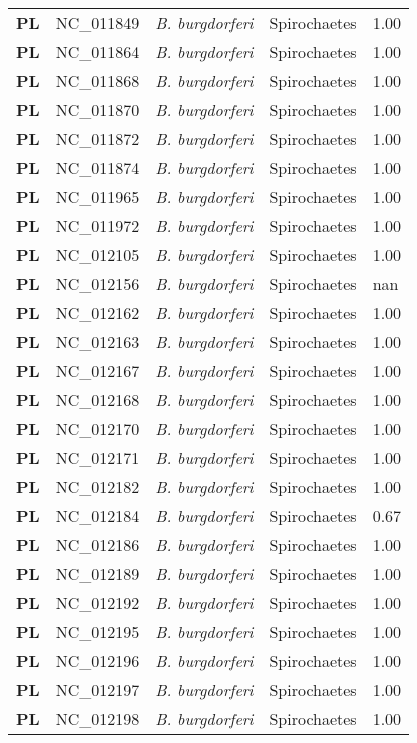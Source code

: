 \begin{adjustwidth}{-3cm}{2cm}
{\begin{supertabular}{>{\bfseries}l|p{0.1\textwidth}p{0.14\textwidth}l|l}
PL & NC\_011849 & \textit{B. burgdorferi} &  Spirochaetes & 1.00\\
PL & NC\_011864 & \textit{B. burgdorferi} &  Spirochaetes & 1.00\\
PL & NC\_011868 & \textit{B. burgdorferi} &  Spirochaetes & 1.00\\
PL & NC\_011870 & \textit{B. burgdorferi} &  Spirochaetes & 1.00\\
PL & NC\_011872 & \textit{B. burgdorferi} &  Spirochaetes & 1.00\\
PL & NC\_011874 & \textit{B. burgdorferi} &  Spirochaetes & 1.00\\
PL & NC\_011965 & \textit{B. burgdorferi} &  Spirochaetes & 1.00\\
PL & NC\_011972 & \textit{B. burgdorferi} &  Spirochaetes & 1.00\\
PL & NC\_012105 & \textit{B. burgdorferi} &  Spirochaetes & 1.00\\
PL & NC\_012156 & \textit{B. burgdorferi} &  Spirochaetes & nan\\
PL & NC\_012162 & \textit{B. burgdorferi} &  Spirochaetes & 1.00\\
PL & NC\_012163 & \textit{B. burgdorferi} &  Spirochaetes & 1.00\\
PL & NC\_012167 & \textit{B. burgdorferi} &  Spirochaetes & 1.00\\
PL & NC\_012168 & \textit{B. burgdorferi} &  Spirochaetes & 1.00\\
PL & NC\_012170 & \textit{B. burgdorferi} &  Spirochaetes & 1.00\\
PL & NC\_012171 & \textit{B. burgdorferi} &  Spirochaetes & 1.00\\
PL & NC\_012182 & \textit{B. burgdorferi} &  Spirochaetes & 1.00\\
PL & NC\_012184 & \textit{B. burgdorferi} &  Spirochaetes & 0.67\\
PL & NC\_012186 & \textit{B. burgdorferi} &  Spirochaetes & 1.00\\
PL & NC\_012189 & \textit{B. burgdorferi} &  Spirochaetes & 1.00\\
PL & NC\_012192 & \textit{B. burgdorferi} &  Spirochaetes & 1.00\\
PL & NC\_012195 & \textit{B. burgdorferi} &  Spirochaetes & 1.00\\
PL & NC\_012196 & \textit{B. burgdorferi} &  Spirochaetes & 1.00\\
PL & NC\_012197 & \textit{B. burgdorferi} &  Spirochaetes & 1.00\\
PL & NC\_012198 & \textit{B. burgdorferi} &  Spirochaetes & 1.00\\

\end{supertabular}}
\end{adjustwidth}
